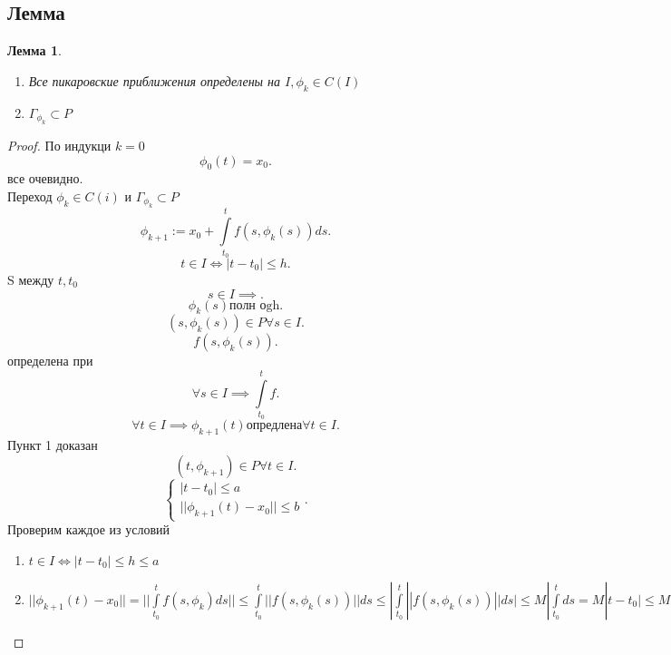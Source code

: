 \documentclass[14pt]{extarticle}
\newtheorem{lemma}[theorem]{Лемма}
\begin{document}
      \subsection{Лемма}
      \begin{lemma}
          \begin{enumerate}
              \item Все пикаровские приближения определены на $I, \phi_{k} \in C(I)$
              \item $\Gamma_{\phi_{k}} \subset P$
          \end{enumerate}
      \end{lemma}
      \begin{proof}
          По индукци $k = 0$
           \[
          \phi_{0}(t) = x_0
          .\] 
          все очевидно.\\
          Переход $\phi_{k} \in C(i) $ и $\Gamma_{\phi_{k}} \subset P$
          \[
          \phi_{k + 1} := x_0 + \int\limits_{t_0}^{t}f(s,\phi_{k}(s)) ds
          .\] 
          \[
          t \in I \iff |t-t_0|\le h
          .\] 
          S между  $t,t_0$
          \[
          s \in I \implies
          .\] 
          \[
              \phi_{k}(s) \text{полн оgh}
          .\] 
          \[
              (s,\phi_{k}(s)) \in P \forall  s\in I
          .\] 
          \[
          f(s,\phi_{k}(s))
          .\] 
          определена при 
          \[
          \forall  s \in I \implies \int\limits_{t_0}^{t} f 
          .\] 
          \[
              \forall  t \in I \implies \phi_{k +1}(t) \text{опредлена} \forall t\in I
          .\] 
          Пункт 1 доказан
          \[
              (t,\phi_{k+1}) \in P \forall  t \in I
          .\] 
          \[
          \begin{cases}
              |t - t_0| \le  a\\
              ||\phi_{k + 1} (t) - x_0|| \le  b
          \end{cases}
          .\] 
          Проверим каждое из условий
          \begin{enumerate}
              \item 
                  $t \in I \iff |t-t_0|\le h \le a$ 
              \item $||\phi_{k+1}(t) - x_0|| = || \int\limits_{t_0}^{t} f(s,\phi_{k}) ds||\le  \int\limits_{t_0}^{t} ||f(s,\phi_{k}(s))||ds \le |\int\limits_{t_0}^{t} ||f(s,\phi_{k}(s))||ds| \le  M | \int\limits_{t_0}^{t} ds = M|t-t_0|\le  Mh = b $
          \end{enumerate}
      \end{proof}
\end{document}
